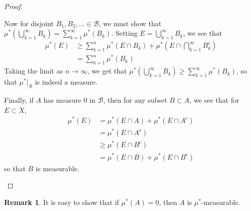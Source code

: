 \documentclass[11pt]{amsart}
\theoremstyle{definition}
\newtheorem{remark}[theorem]{Remark}
\numberwithin{equation}{section}
\begin{document}
\begin{proof}
\begin{enumerate}
        Now for disjoint $B_1,B_2,\ldots\in\mathcal B$, we must show that $\mu^*(\bigcup_{k=1}^\infty B_k)=\sum_{k=1}^\infty\mu^*(B_k)$. Setting $E=\bigcup_{k=1}^\infty B_k$, we see that
        \begin{align*}
            \mu^*(E)&\ge\sum_{k=1}^n\mu^*(E\cap B_k)+\mu^*(E\cap\bigcap_{k=1}^\infty B_k^c)\\
            &=\sum_{k=1}^n\mu^*(B_k)
        \end{align*}
        Taking the limit as $n\to\infty$, we get that $\mu^*(\bigcup_{k=1}^\infty B_k)\ge\sum_{k=1}^\infty\mu^*(B_k)$, so that $\mu^*|_\mathcal B$ is indeed a measure.

        Finally, if $A$ has measure 0 in $\mathcal B$, then for any subset $B\subset A$, we see that for $E\subset X$,
        \begin{align*}
            \mu^*(E)&=\mu^*(E\cap A)+\mu^*(E\cap A^c)\\
            &=\mu^*(E\cap A^c)\\
            &\ge\mu^*(E\cap B^c)\\
            &=\mu^*(E\cap B)+\mu^*(E\cap B^c)
        \end{align*}
        so that $B$ is measurable.
    \end{enumerate}
\end{proof}
\begin{remark}
    It is easy to show that if $\mu^*(A)=0$, then $A$ is $\mu^*$-measurable.
\end{remark}
\end{document}
